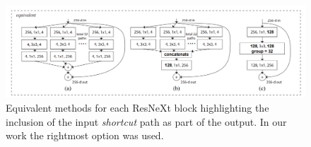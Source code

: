 \documentclass[12pt]{article}
\numberwithin{equation}{section}
\numberwithin{figure}{section}
\begin{document}
	\begin{figure}
		\centering
		\captionsetup{justification=centering}
		\includegraphics[scale=0.5]{resnextblocks.PNG}
		\caption{\cite{Xie2016} Equivalent methods for each ResNeXt block highlighting the inclusion of the input \emph{shortcut} path as part of the output. In our work the rightmost option was used.}
		\label{fig:resnextblocks}
	\end{figure}
\end{document}
